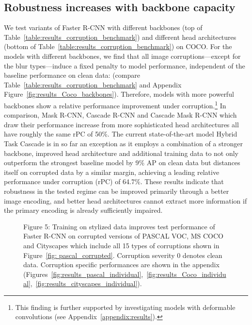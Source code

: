 \documentclass{article}
\begin{document}
\subsection{Robustness increases with backbone capacity}
We test variants of Faster R-CNN with different backbones (top of Table~\ref{table:results_corruption_benchmark}) and different head architectures (bottom of Table~\ref{table:results_corruption_benchmark}) on COCO. For the models with different backbones, we find that all image corruptions---except for the blur types---induce a fixed penalty to model performance, independent of the baseline performance on clean data:  (compare Table~\ref{table:results_corruption_benchmark} and Appendix Figure~\ref{fig:results_Coco_backbones}). Therefore, models with more powerful backbones show a relative performance improvement under corruption.\footnote{This finding is further supported by investigating models with deformable convolutions (see Appendix~\ref{appendix:results}).} 
In comparison, Mask R-CNN, Cascade R-CNN and Cascade Mask R-CNN which draw their performance increase from more sophisticated head architectures all have roughly the same rPC of  50\%. 
The current state-of-the-art model Hybrid Task Cascade \citep{Chen2019hybrid} is in so far an exception as it employs a combination of a stronger backbone, improved head architecture and additional training data to not only outperform the strongest baseline model by 9\% AP on clean data but distances itself on corrupted data by a similar margin, achieving a leading relative performance under corruption (rPC) of 64.7\%.
These results indicate that robustness in the tested regime can be improved primarily through a better image encoding, and better head architectures cannot extract more information if the primary encoding is already sufficiently impaired.

\begin{figure}[t!]
\captionsetup[subfigure]{justification=centering}
	\centering
	\vspace{-0.15cm}
	\caption{Figure 5: Training on stylized data improves test performance of Faster R-CNN on corrupted versions of PASCAL VOC, MS COCO and Cityscapes which include all 15 types of corruptions shown in Figure~\ref{fig: pascal_corrupted}. Corruption severity 0 denotes clean data. Corruption specific performances are shown in the appendix (Figures~\ref{fig:results_pascal_individual},~\ref{fig:results_Coco_individual},~\ref{fig:results_cityscapes_individual}).
}
	\label{fig:results_combined}
	\vspace{-0.2cm}
\end{figure}
\end{document}
